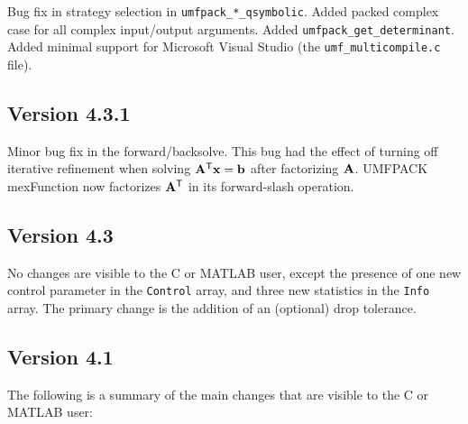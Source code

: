 \documentclass[11pt]{article}
\newcommand{\m}[1]{{\bf{#1}}}       %
\newcommand{\tr}{^{\sf T}}          %
\begin{document}
Bug fix in strategy selection in {\tt umfpack\_*\_qsymbolic}.
Added packed complex case for all complex input/output arguments.
Added {\tt umfpack\_get\_determinant}.
Added minimal support for Microsoft Visual Studio
(the {\tt umf\_multicompile.c} file).

\subsection{Version 4.3.1}

Minor bug fix in the forward/backsolve.  This bug had the effect of turning
off iterative refinement when solving $\m{A}\tr\m{x}=\m{b}$ after factorizing
$\m{A}$.  UMFPACK mexFunction now factorizes $\m{A}\tr$ in its forward-slash
operation.

\subsection{Version 4.3}

No changes are visible to the C or MATLAB user, except the presence of
one new control parameter in the {\tt Control} array,
and three new statistics in the {\tt Info} array.
The primary change is the addition of an (optional) drop tolerance.

\subsection{Version 4.1}

The following is a summary of the main changes that are visible to the C
or MATLAB user:
\end{document}
